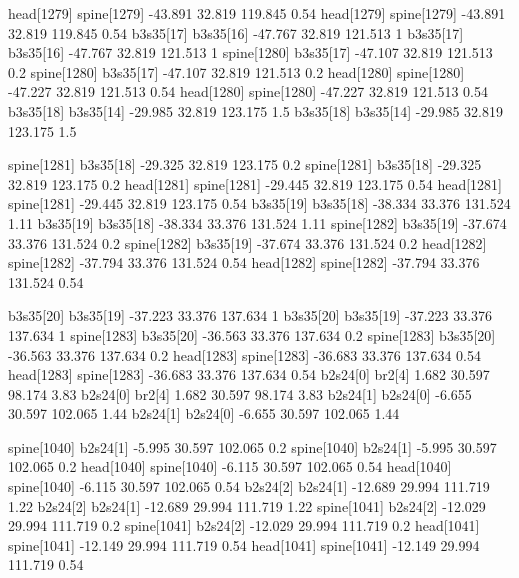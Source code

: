 head[1279]    spine[1279]    -43.891    32.819    119.845    0.54
head[1279]    spine[1279]    -43.891    32.819    119.845    0.54
b3s35[17]    b3s35[16]    -47.767    32.819    121.513    1
b3s35[17]    b3s35[16]    -47.767    32.819    121.513    1
spine[1280]    b3s35[17]    -47.107    32.819    121.513    0.2
spine[1280]    b3s35[17]    -47.107    32.819    121.513    0.2
head[1280]    spine[1280]    -47.227    32.819    121.513    0.54
head[1280]    spine[1280]    -47.227    32.819    121.513    0.54
b3s35[18]    b3s35[14]    -29.985    32.819    123.175    1.5
b3s35[18]    b3s35[14]    -29.985    32.819    123.175    1.5


spine[1281]    b3s35[18]    -29.325    32.819    123.175    0.2
spine[1281]    b3s35[18]    -29.325    32.819    123.175    0.2
head[1281]    spine[1281]    -29.445    32.819    123.175    0.54
head[1281]    spine[1281]    -29.445    32.819    123.175    0.54
b3s35[19]    b3s35[18]    -38.334    33.376    131.524    1.11
b3s35[19]    b3s35[18]    -38.334    33.376    131.524    1.11
spine[1282]    b3s35[19]    -37.674    33.376    131.524    0.2
spine[1282]    b3s35[19]    -37.674    33.376    131.524    0.2
head[1282]    spine[1282]    -37.794    33.376    131.524    0.54
head[1282]    spine[1282]    -37.794    33.376    131.524    0.54


b3s35[20]    b3s35[19]    -37.223    33.376    137.634    1
b3s35[20]    b3s35[19]    -37.223    33.376    137.634    1
spine[1283]    b3s35[20]    -36.563    33.376    137.634    0.2
spine[1283]    b3s35[20]    -36.563    33.376    137.634    0.2
head[1283]    spine[1283]    -36.683    33.376    137.634    0.54
head[1283]    spine[1283]    -36.683    33.376    137.634    0.54
b2s24[0]    br2[4]    1.682    30.597    98.174    3.83
b2s24[0]    br2[4]    1.682    30.597    98.174    3.83
b2s24[1]    b2s24[0]    -6.655    30.597    102.065    1.44
b2s24[1]    b2s24[0]    -6.655    30.597    102.065    1.44


spine[1040]    b2s24[1]    -5.995    30.597    102.065    0.2
spine[1040]    b2s24[1]    -5.995    30.597    102.065    0.2
head[1040]    spine[1040]    -6.115    30.597    102.065    0.54
head[1040]    spine[1040]    -6.115    30.597    102.065    0.54
b2s24[2]    b2s24[1]    -12.689    29.994    111.719    1.22
b2s24[2]    b2s24[1]    -12.689    29.994    111.719    1.22
spine[1041]    b2s24[2]    -12.029    29.994    111.719    0.2
spine[1041]    b2s24[2]    -12.029    29.994    111.719    0.2
head[1041]    spine[1041]    -12.149    29.994    111.719    0.54
head[1041]    spine[1041]    -12.149    29.994    111.719    0.54


